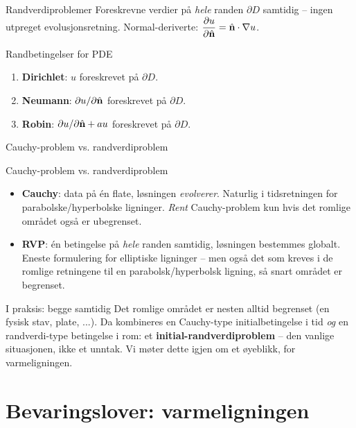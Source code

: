 \documentclass[11pt,aspectratio=169]{beamer}
\begin{document}
\begin{frame}{Randverdiproblemer}
Foreskrevne verdier på \emph{hele} randen $\partial D$ samtidig -- ingen utpreget evolusjonsretning. Normal-deriverte: $\dfrac{\partial u}{\partial\hat{\mathbf{n}}}=\hat{\mathbf{n}}\cdot\nabla u$.
\begin{oppsumb}{Randbetingelser for PDE}
\begin{enumerate}
\item \textbf{Dirichlet}: $u$ foreskrevet på $\partial D$.
\item \textbf{Neumann}: $\partial u/\partial\hat{\mathbf{n}}$ foreskrevet på $\partial D$.
\item \textbf{Robin}: $\partial u/\partial\hat{\mathbf{n}} + au$ foreskrevet på $\partial D$.
\end{enumerate}
\end{oppsumb}
\end{frame}

\begin{frame}{Cauchy-problem vs. randverdiproblem}
\begin{oppsumb}{Cauchy-problem vs. randverdiproblem}
\begin{itemize}
\item \textbf{Cauchy}: data på én flate, løsningen \emph{evolverer}. Naturlig i tidsretningen for parabolske/hyperbolske ligninger. \emph{Rent} Cauchy-problem kun hvis det romlige området også er ubegrenset.
\item \textbf{RVP}: én betingelse på \emph{hele} randen samtidig, løsningen bestemmes globalt. Eneste formulering for elliptiske ligninger -- men også det som kreves i de romlige retningene til en parabolsk/hyperbolsk ligning, så snart området er begrenset.
\end{itemize}
\end{oppsumb}
\begin{remb}{I praksis: begge samtidig}
Det romlige området er nesten alltid begrenset (en fysisk stav, plate, ...). Da kombineres en Cauchy-type initialbetingelse i tid \emph{og} en randverdi-type betingelse i rom: et \textbf{initial-randverdiproblem} -- den vanlige situasjonen, ikke et unntak. Vi møter dette igjen om et øyeblikk, for varmeligningen.
\end{remb}
\end{frame}

\section{Bevaringslover: varmeligningen}
\end{document}
